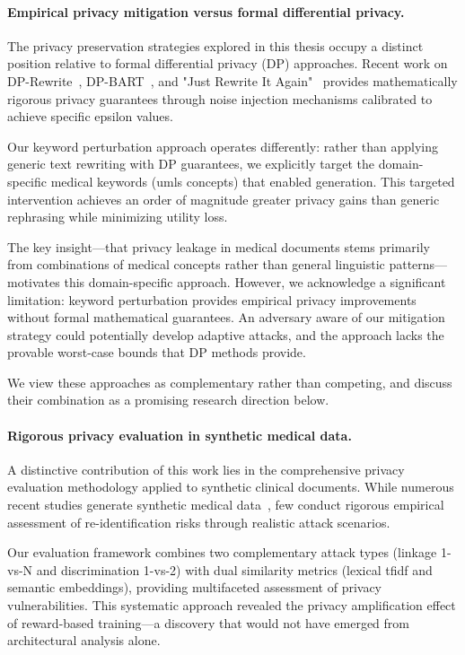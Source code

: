 \paragraph{Empirical privacy mitigation versus formal differential privacy.}

The privacy preservation strategies explored in this thesis occupy a distinct position relative to formal differential privacy (DP) approaches.
Recent work on DP-Rewrite~\cite{igamberdiev2022dprewrite}, DP-BART~\cite{igamberdiev2023dpbart}, and "Just Rewrite It Again"~\cite{igamberdiev2024rewriteagain} provides mathematically rigorous privacy guarantees through noise injection mechanisms calibrated to achieve specific epsilon values.

Our keyword perturbation approach operates differently: rather than applying generic text rewriting with DP guarantees, we explicitly target the domain-specific medical keywords (\gls{umls} concepts) that enabled generation.
This targeted intervention achieves an order of magnitude greater privacy gains than generic rephrasing while minimizing utility loss.

The key insight—that privacy leakage in medical documents stems primarily from combinations of medical concepts rather than general linguistic patterns—motivates this domain-specific approach.
However, we acknowledge a significant limitation: keyword perturbation provides empirical privacy improvements without formal mathematical guarantees.
An adversary aware of our mitigation strategy could potentially develop adaptive attacks, and the approach lacks the provable worst-case bounds that DP methods provide.

We view these approaches as complementary rather than competing, and discuss their combination as a promising research direction below.

\paragraph{Rigorous privacy evaluation in synthetic medical data.}

A distinctive contribution of this work lies in the comprehensive privacy evaluation methodology applied to synthetic clinical documents.
While numerous recent studies generate synthetic medical data~\cite{kweon2024asclepius,xieDifferentiallyPrivateSynthetic2024,li_synthetic_2024}, few conduct rigorous empirical assessment of re-identification risks through realistic attack scenarios.

Our evaluation framework combines two complementary attack types (linkage 1-vs-N and discrimination 1-vs-2) with dual similarity metrics (lexical \gls{tfidf} and semantic embeddings), providing multifaceted assessment of privacy vulnerabilities.
This systematic approach revealed the privacy amplification effect of reward-based training—a discovery that would not have emerged from architectural analysis alone.

